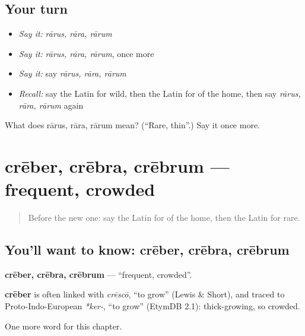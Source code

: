 \subsection*{Your turn}
\begin{itemize}
\raggedright
  \item \emph{Say it:} \emph{rārus, rāra, rārum}
  \item \emph{Say it:} \emph{rārus, rāra, rārum}, once more
  \item \emph{Say it:} say \emph{rārus, rāra, rārum}
  \item \emph{Recall:} say the Latin for wild, then the Latin for of the home, then say \emph{rārus, rāra, rārum} again
\end{itemize}

\begin{tcolorbox}[breakable,colback=teal!4,colframe=teal!35!black,title={Before you move on}]
What does rārus, rāra, rārum mean? (\textquotedblleft{}Rare, thin\textquotedblright{}.) Say it once more.
\end{tcolorbox}
\section[crēber, crēbra, crēbrum]{crēber, crēbra, crēbrum — frequent, crowded}

\label{lesson:LA-C214-creber}



\begin{quote}
Before the new one: say the Latin for of the home, then the Latin for rare.
\end{quote}

\subsection*{You'll want to know: crēber, crēbra, crēbrum}
\textbf{crēber, crēbra, crēbrum} — \textquotedblleft{}frequent, crowded\textquotedblright{}.

\begin{cousinweb}
\textbf{crēber} is often linked with \emph{crēscō}, \textquotedblleft{}to grow\textquotedblright{} (Lewis \& Short), and traced to Proto-Indo-European \emph{*ker-}, \textquotedblleft{}to grow\textquotedblright{} (EtymDB 2.1): thick-growing, so crowded.
\end{cousinweb}

\begin{grammarlens}[title={What you've built}]
One more word for this chapter.
\end{grammarlens}


